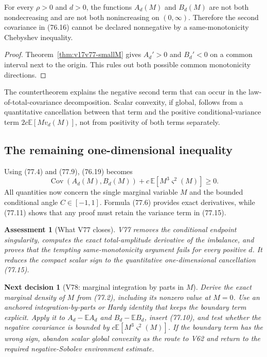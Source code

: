 \documentclass[11pt]{article}
\newtheorem{decision}[theorem]{Next decision}
\newtheorem{assessment}[theorem]{Assessment}
\theoremstyle{remark}
\begin{document}
\begin{countertheorem}
\label{ctr:v17v77-chebyshev}
For every \(\rho>0\) and \(d>0\), the functions \(A_d(M)\) and
\(B_d(M)\) are not both nondecreasing and are not both nonincreasing
on \((0,\infty)\).  Therefore the second covariance in (76.16) cannot
be declared nonnegative by a same-monotonicity Chebyshev inequality.
\end{countertheorem}

\begin{proof}
Theorem~\ref{thm:v17v77-smallM} gives
\(A_d'>0\) and \(B_d'<0\) on a common interval next to the origin.
This rules out both possible common monotonicity directions.
\end{proof}

The countertheorem explains the negative second term that can occur in
the law-of-total-covariance decomposition.  Scalar convexity, if
global, follows from a quantitative cancellation between that term and
the positive conditional-variance term
\(2c\mathbb E[Mv_d(M)]\), not from positivity of both terms separately.

\subsection{The remaining one-dimensional inequality}

Using (77.4) and (77.9), (76.19) becomes
\[
\boxed{
 \operatorname{Cov}(A_d(M),B_d(M))
 +c\,\mathbb E[M^3\varsigma^2(M)]\geq0.}          \tag{77.15}
\]
All quantities now concern the single marginal variable \(M\) and
the bounded conditional angle \(C\in[-1,1]\).  Formula (77.6)
provides exact derivatives, while (77.11) shows that any proof must
retain the variance term in (77.15).

\begin{assessment}[What V77 closes]
\label{ass:v17v77-status}
V77 removes the conditional endpoint singularity, computes the exact
total-amplitude derivative of the imbalance, and proves that the
tempting same-monotonicity argument fails for every positive \(d\).
It reduces the compact scalar sign to the quantitative one-dimensional
cancellation (77.15).
\end{assessment}

\begin{decision}[V78: marginal integration by parts in \(M\)]
\label{dec:v17v77-next}
Derive the exact marginal density of \(M\) from (77.2), including its
nonzero value at \(M=0\).  Use an anchored integration-by-parts or
Hardy identity that keeps the boundary term explicit.  Apply it to
\(A_d-\mathbb EA_d\) and \(B_d-\mathbb EB_d\), insert (77.10), and
test whether the negative covariance is bounded by
\(c\mathbb E[M^3\varsigma^2(M)]\).  If the boundary term has the wrong
sign, abandon scalar global convexity as the route to V62 and return to
the required negative-Sobolev environment estimate.
\end{decision}
\end{document}
